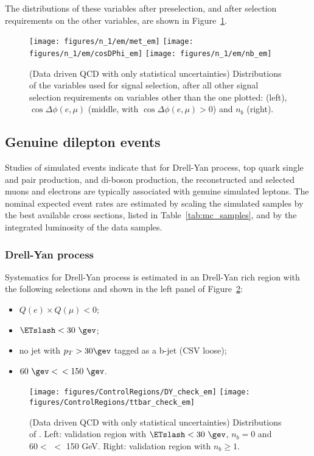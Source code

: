 The distributions of these variables after preselection, and after
selection requirements on the other variables, are shown in
Figure~\ref{fig:em_nm1_distributions}.

\begin{figure}\centering
  \texttt{[image: figures/n\_1/em/met\_em]}
  \texttt{[image: figures/n\_1/em/cosDPhi\_em]}
  \texttt{[image: figures/n\_1/em/nb\_em]}
  \caption{\label{fig:em_nm1_distributions} (Data driven QCD with only statistical uncertainties) Distributions of the
    variables used for \teth signal selection, after all other signal
    selection requirements on variables other than the one plotted:
    \ETslash (left), $\cos{\Delta \phi (e,\mu)}$ (middle, with $\cos{\Delta \phi (e, \mu)} > 0$) and $n_b$ (right).}
\end{figure}

\subsection{Genuine dilepton events}
Studies of simulated events indicate that for Drell-Yan process, top
quark single and pair production, and di-boson production, the
reconstructed and selected muons and electrons are typically
associated with genuine simulated leptons.  The nominal expected event
rates are estimated by scaling the simulated samples by the best
available cross sections, listed in Table~\ref{tab:mc_samples}, and by
the integrated luminosity of the data samples.

\subsubsection{Drell-Yan process}\label{sec:em_DY}
Systematics for Drell-Yan process is estimated in an Drell-Yan rich 
region with the following selections and shown in the left panel of 
Figure~\ref{fig:em_dy_tt}:
\begin{itemize}
  \item $Q(e) \times Q(\mu) < 0$;
  \item $\ETslash<30~\gev$;
  \item no jet with $p_T>30\gev$ tagged as a b-jet (CSV loose);
  \item $60~\gev <$ \meffemu $<150~\gev$\quad.
\end{itemize}

\begin{figure}\centering
  \texttt{[image: figures/ControlRegions/DY\_check\_em]}
  \texttt{[image: figures/ControlRegions/ttbar\_check\_em]}
  \caption{\label{fig:em_dy_tt} (Data driven QCD with only statistical uncertainties) Distributions of \meffetau. Left:
    validation region with $\ETslash<30~\gev$, $n_b = 0$ and $60<$ \gev \meffemu $<$ 150 GeV.  Right:
    validation region with $n_b\geq1$.}
\end{figure}

